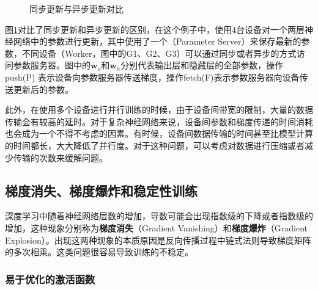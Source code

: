 \begin{figure}[htp]
\centering

\caption{同步更新与异步更新对比}
\label{fig:5-47}
\end {figure}

\parinterval  图\ref{fig:5-47}对比了同步更新和异步更新的区别，在这个例子中，使用4台设备对一个两层神经网络中的参数进行更新，其中使用了一个{\small{}}（Parameter Server）来保存最新的参数，不同设备（Worker，图中的G1、G2、G3）可以通过同步或者异步的方式访问参数服务器。图中的$ \mathbf w_o $和$ \mathbf w_h $分别代表输出层和隐藏层的全部参数，操作push(P) 表示设备向参数服务器传送梯度，操作fetch(F)表示参数服务器向设备传送更新后的参数。

\parinterval  此外，在使用多个设备进行并行训练的时候，由于设备间带宽的限制，大量的数据传输会有较高的延时。对于复杂神经网络来说，设备间参数和梯度传递的时间消耗也会成为一个不得不考虑的因素。有时候，设备间数据传输的时间甚至比模型计算的时间都长，大大降低了并行度\cite{xiao2017fast}。对于这种问题，可以考虑对数据进行压缩或者减少传输的次数来缓解问题。


\subsection{梯度消失、梯度爆炸和稳定性训练}\label{sec:5.4.4}

\parinterval  深度学习中随着神经网络层数的增加，导数可能会出现指数级的下降或者指数级的增加，这种现象分别称为{\small\sffamily\bfseries{梯度消失}}（Gradient Vanishing）和{\small\sffamily\bfseries{梯度爆炸}}（Gradient Explosion）。出现这两种现象的本质原因是反向传播过程中链式法则导致梯度矩阵的多次相乘。这类问题很容易导致训练的不稳定。


\subsubsection{易于优化的激活函数}

